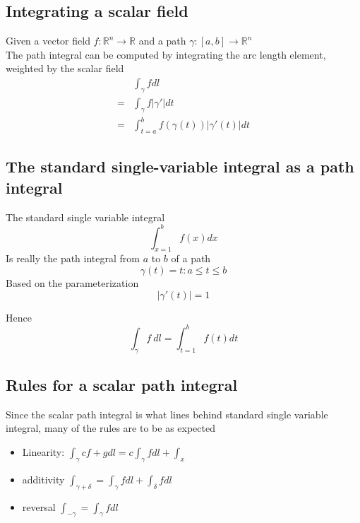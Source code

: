 \subsection{Integrating a scalar field}
\begin{framed}
   Given a vector field $f: \mathbb{R}^n \rightarrow \mathbb{R}$ and a path $ \gamma: [a, b] \rightarrow \mathbb{R}^n$ \\
   
   The path integral can be computed by integrating the arc length element, weighted by the scalar field
   \begin{align*}
      &\int_{\gamma} f dl \\
      =& \int_{\gamma} f \left| \gamma ' \right|  dt \\
      =& \int_{t = a}^{b} f \left( \gamma \left( t \right)  \right) \left| \gamma ' \left( t \right)  \right| dt 
   \end{align*}
\end{framed}

\subsection{The standard single-variable integral as a path integral}

The standard single variable integral
\[
   \int_{x=1}^{b} f(x) dx  
\] 
Is really the path integral from $a$ to $b$ of a path 
\[
  \gamma (t) = t: a \leq t \leq b
\] 
Based on the parameterization
\[
  \left| \gamma ' (t)  \right| = 1
\] 

Hence 
\[
   \int_{\gamma} f\ dl = \int_{t= 1}^{b}  f(t) dt 
\]  

\subsection{Rules for a scalar path integral}

Since the scalar path integral is what lines behind standard single variable integral, many of the rules are to be as expected
  \begin{itemize}
     \item Linearity: $\int_{\gamma}^{}  c f + g dl = c \int_{\gamma}^{} f dl + \int_{x}^{} $
     \item additivity $\int_{\gamma + \delta}^{}  = \int_{\gamma}^{} f dl + \int_{\delta}^{} fdl$
     \item reversal $\int_{-\gamma}^{}  = \int_{\gamma}^{} f dl   $
  \end{itemize}

